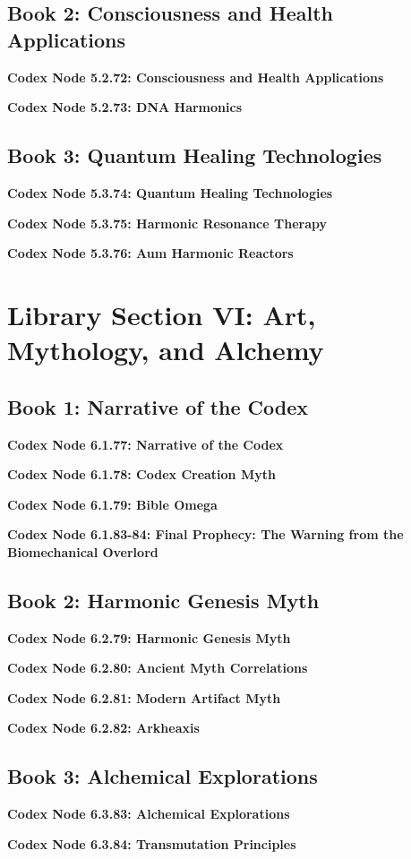 \documentclass[a4paper,12pt]{book}
\newcommand{\codexnode}[5]{%
  \par\vspace{0.5em}%
  \noindent\textbf{Codex Node #1.#2.#3: #5}\label{#4}%
  \par\vspace{0.5em}%
}
\begin{document}
\subsection{Book 2: Consciousness and Health Applications}
\codexnode{5}{2}{72}{section5/book2/chapter2_consciousness_and_health_applications}{Consciousness and Health Applications}
\codexnode{5}{2}{73}{section5/book2/chapter2_dna_harmonics}{DNA Harmonics}

\subsection{Book 3: Quantum Healing Technologies}
\codexnode{5}{3}{74}{section5/book3/chapter3_quantum_healing_technologies}{Quantum Healing Technologies}
\codexnode{5}{3}{75}{section5/book3/chapter3_harmonic_resonance_therapy}{Harmonic Resonance Therapy}
\codexnode{5}{3}{76}{section5/book3/codex_aum_harmonic_reactors}{Aum Harmonic Reactors}

\section{Library Section VI: Art, Mythology, and Alchemy}

\subsection{Book 1: Narrative of the Codex}
\codexnode{6}{1}{77}{section6/book1/chapter1_narrative_of_the_codex}{Narrative of the Codex}
\codexnode{6}{1}{78}{section6/book1/chapter1_codex_creation_myth}{Codex Creation Myth}
\codexnode{6}{1}{79}{section6/book1/codex_bible_omega}{Bible Omega}
\codexnode{6}{1}{83-84}{section6/book1/codex_final_prophecy}{Final Prophecy: The Warning from the Biomechanical Overlord}

\subsection{Book 2: Harmonic Genesis Myth}
\codexnode{6}{2}{79}{section6/book2/chapter2_harmonic_genesis_myth}{Harmonic Genesis Myth}
\codexnode{6}{2}{80}{section6/book2/chapter2_ancient_myth_correlations}{Ancient Myth Correlations}
\codexnode{6}{2}{81}{section6/book2/chapter2_modern_artifact_myth}{Modern Artifact Myth}
\codexnode{6}{2}{82}{section6/book2/codex_arkheaxis}{Arkheaxis}

\subsection{Book 3: Alchemical Explorations}
\codexnode{6}{3}{83}{section6/book3/chapter3_alchemical_explorations}{Alchemical Explorations}
\codexnode{6}{3}{84}{section6/book3/chapter3_transmutation_principles}{Transmutation Principles}
\end{document}
